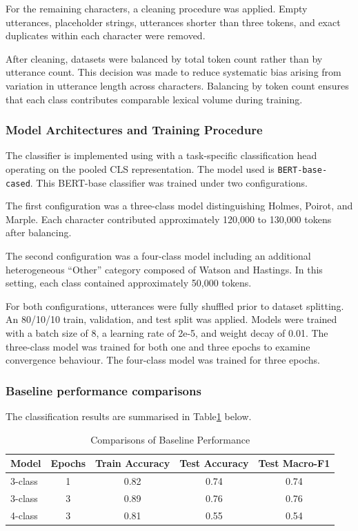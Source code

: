 \documentclass{article}
\begin{document}
For the remaining characters, a cleaning procedure was applied. Empty utterances, placeholder strings, utterances shorter than three tokens, and exact duplicates within each character were removed.

After cleaning, datasets were balanced by total token count rather than by utterance count. This decision was made to reduce systematic bias arising from variation in utterance length across characters. Balancing by token count ensures that each class contributes comparable lexical volume during training.

\subsubsection{Model Architectures and Training Procedure}

The classifier is implemented using with a task-specific classification head operating on the pooled CLS representation. The model used is \texttt{BERT-base-cased}. This BERT-base classifier was trained under two configurations.

The first configuration was a three-class model distinguishing Holmes, Poirot, and Marple. Each character contributed approximately 120,000 to 130,000 tokens after balancing.

The second configuration was a four-class model including an additional heterogeneous “Other” category composed of Watson and Hastings. In this setting, each class contained approximately 50,000 tokens.

For both configurations, utterances were fully shuffled prior to dataset splitting. An 80/10/10 train, validation, and test split was applied. Models were trained with a batch size of 8, a learning rate of 2e-5, and weight decay of 0.01. The three-class model was trained for both one and three epochs to examine convergence behaviour. The four-class model was trained for three epochs.

\subsubsection{Baseline performance comparisons}

The classification results are summarised in Table\ref{model_compare}  below.

\begin{table}[h]
\centering
\begin{tabular}{lcccc}
    \hline
    Model & Epochs & Train Accuracy & Test Accuracy & Test Macro-F1 \\
    \hline
    3-class & 1 & 0.82 & 0.74 & 0.74 \\
    3-class & 3 & 0.89 & 0.76 & 0.76 \\
    4-class & 3 & 0.81 & 0.55 & 0.54 \\
    \hline
    \end{tabular}
\caption{Comparisons of Baseline Performance}
\label{model_compare}
\end{table}
\end{document}

